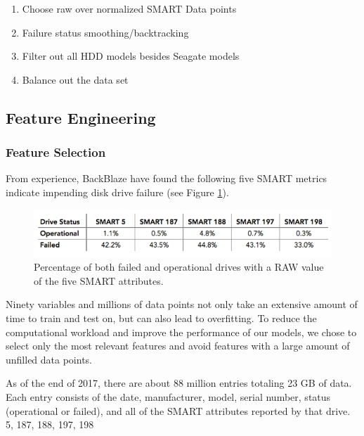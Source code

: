 \documentclass[12pt,a4paper,english]{amsart}
\begin{document}
\begin{enumerate}
	\item Choose raw over normalized SMART Data points
	\item Failure status smoothing/backtracking
	\item Filter out all HDD models besides Seagate models
	\item Balance out the data set
\end{enumerate}

\subsection{Feature Engineering}

\subsubsection*{Feature Selection}


From experience, BackBlaze have found the following five SMART metrics indicate impending disk drive failure (see Figure \ref{fig:raw-fail-percentage}).

\begin{figure}[htb]
	\centering
	\includegraphics[width=\textwidth]{img/blog-smart-fail-vs-good.png}
	\caption{Percentage of both failed and operational drives with a RAW value of the five SMART attributes.}\label{fig:raw-fail-percentage}
\end{figure}

Ninety variables and millions of data points not only take an extensive amount of time to train and test on, but can also lead to overfitting. To reduce the computational workload and improve the performance of our models, we chose to select only the most relevant features and avoid features with a large amount of unfilled data points.

As of the end of 2017, there are about 88 million entries totaling 23 GB of data. Each entry consists of the date, manufacturer, model, serial number, status (operational or failed), and all of the SMART attributes reported by that drive. 
5, 187, 188, 197, 198
\end{document}
